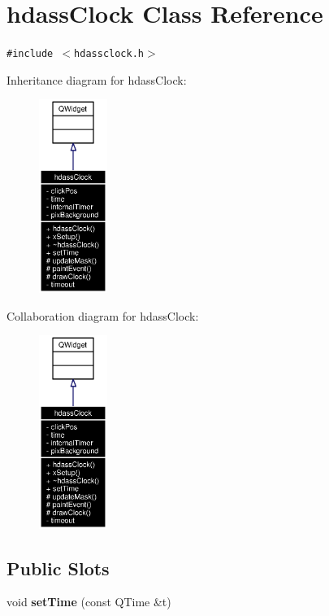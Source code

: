 \section{hdass\-Clock Class Reference}
\label{classhdassClock}
{\tt \#include $<$hdassclock.h$>$}

Inheritance diagram for hdass\-Clock:\begin{figure}[H]
\begin{center}
\leavevmode
\includegraphics[width=63pt]{classhdassClock__inherit__graph}
\end{center}
\end{figure}
Collaboration diagram for hdass\-Clock:\begin{figure}[H]
\begin{center}
\leavevmode
\includegraphics[width=63pt]{classhdassClock__coll__graph}
\end{center}
\end{figure}
\subsection*{Public Slots}
\begin{CompactItemize}
\item 
void {\bf set\-Time} (const QTime \&t)
\end{CompactItemize}
